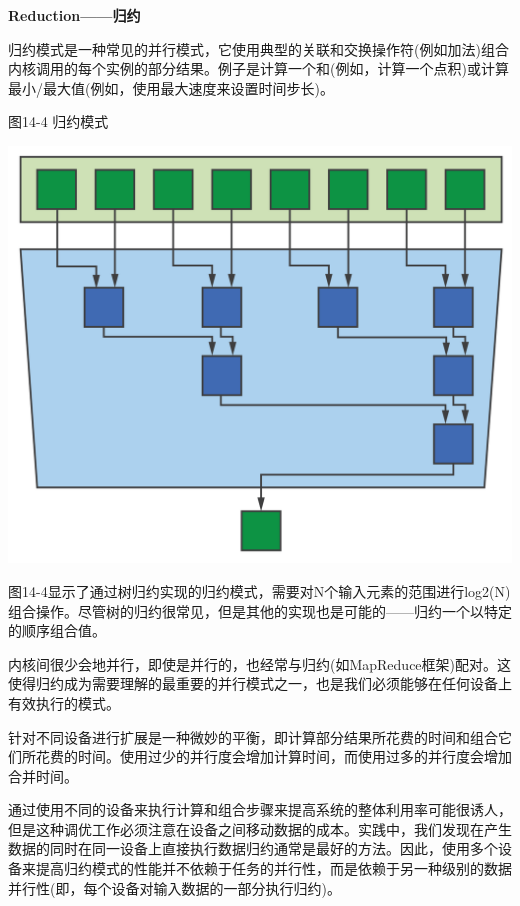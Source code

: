 \hspace*{\fill} \par %
\textbf{Reduction——归约}

归约模式是一种常见的并行模式，它使用典型的关联和交换操作符(例如加法)组合内核调用的每个实例的部分结果。例子是计算一个和(例如，计算一个点积)或计算最小/最大值(例如，使用最大速度来设置时间步长)。\par

\hspace*{\fill} \par %
图14-4 归约模式
\begin{center}
	\includegraphics[width=1.\textwidth]{content/chapter-14/images/4}
\end{center}

图14-4显示了通过树归约实现的归约模式，需要对N个输入元素的范围进行log2(N)组合操作。尽管树的归约很常见，但是其他的实现也是可能的——归约一个以特定的顺序组合值。\par

内核间很少会地并行，即使是并行的，也经常与归约(如MapReduce框架)配对。这使得归约成为需要理解的最重要的并行模式之一，也是我们必须能够在任何设备上有效执行的模式。\par

针对不同设备进行扩展是一种微妙的平衡，即计算部分结果所花费的时间和组合它们所花费的时间。使用过少的并行度会增加计算时间，而使用过多的并行度会增加合并时间。\par

通过使用不同的设备来执行计算和组合步骤来提高系统的整体利用率可能很诱人，但是这种调优工作必须注意在设备之间移动数据的成本。实践中，我们发现在产生数据的同时在同一设备上直接执行数据归约通常是最好的方法。因此，使用多个设备来提高归约模式的性能并不依赖于任务的并行性，而是依赖于另一种级别的数据并行性(即，每个设备对输入数据的一部分执行归约)。\par

